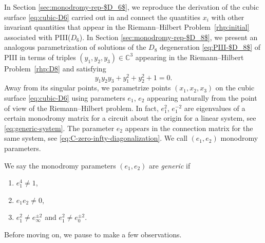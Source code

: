 \documentclass[11pt]{article}
\numberwithin{equation}{section}
\numberwithin{equation}{section}
\newcommand{\C}{{\mathbb{C}}}
\begin{document}
In Section \ref{sec:monodromy-rep-$D_6$}, we reproduce the derivation of the cubic surface \eqref{eq:cubic-D6} carried out in \cite{PS} and connect the quantities $x_i$ with other invariant quantities that appear in the Riemann--Hilbert Problem~\ref{rhp:initial} associated with PIII($D_6$). In Section \ref{sec:monodromy-rep-$D_8$}, we present an analogous parametrization of solutions of the $D_8$ degeneration \eqref{eq:PIII-$D_8$} of PIII in terms of triples $(y_1, y_2, y_3) \in \C^3$ appearing in the Riemann--Hilbert Problem~\ref{rhp:D8} and satisfying
\begin{equation}
\label{eq:cubic-D8}
y_1 y_2 y_3 + y_1^2 + y_2^2 + 1 = 0.
\end{equation}
Away from its singular points, we parametrize points $(x_1,x_2,x_3)$ on the cubic surface \eqref{eq:cubic-D6} using parameters $e_1$, $e_2$ appearing naturally from the point of view of the Riemann--Hilbert problem. In fact, $e_1^2$, $e_1^{-2}$ are eigenvalues of a certain monodromy matrix for a circuit about the origin for a linear system, see \eqref{eq:generic-system}. The parameter $e_2$ appears in the connection matrix for the same system, see \eqref{eq:C-zero-infty-diagonalization}.
We call $(e_1,e_2)$ monodromy parameters.
\begin{Definition}\label{def:generic}\samepage
We say the monodromy parameters $(e_1, e_2)$ are \emph{generic} if
 \begin{enumerate}\itemsep=0pt
 \item[(i)] $e_1^4 \neq 1$,
 \item[(ii)] $e_1 e_2 \neq 0$,
 \item[(iii)] $e_1^2 \neq e_\infty^{\pm 2}$ and $e_1^2 \neq e_0^{\pm 2}$.
 \end{enumerate}
\end{Definition}
Before moving on, we pause to make a few observations.
\end{document}
